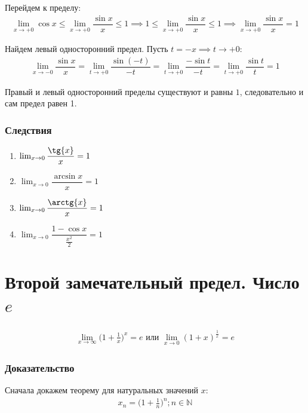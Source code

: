 \documentclass[a4paper,12pt]{extbook}
\theoremstyle{named}
\theoremstyle{named}
\begin{document}
Перейдем к пределу:
\begin{gather*}
    \lim_{x \to +0}{\cos{x}} \leq \lim_{x \to +0}{\dfrac{\sin{x}}{x}} \leq 1 \implies 1 \leq \lim_{x \to +0}{\dfrac{\sin{x}}{x}} \leq 1 \implies \lim_{x \to +0}{\dfrac{\sin{x}}{x}} = 1
\end{gather*}

Найдем левый односторонний предел. Пусть \(t = -x \implies t \to +0\):
\begin{gather*}
    \lim_{x \to -0}{\dfrac{\sin{x}}{x}} = \lim_{t \to +0}{\dfrac{\sin{(-t)}}{-t}} = \lim_{t \to +0}{\dfrac{-\sin{t}}{-t}} = \lim_{t \to +0}{\dfrac{\sin{t}}{t}} = 1
\end{gather*}

Правый и левый односторонний пределы существуют и равны \(1\), следовательно и сам предел равен 1.

\subsubsection*{Следствия}
\begin{enumerate}
    \item {\(\lim_{x \to 0}{\dfrac{\tg{x}}{x}} = 1\)}
    \item {\(\lim_{x \to 0}{\dfrac{\arcsin{x}}{x}} = 1\)}
    \item {\(\lim_{x \to 0}{\dfrac{\arctg{x}}{x}} = 1\)}
    \item {\(\lim_{x \to 0}{\dfrac{1 - \cos{x}}{\frac{x^2}{2}}} = 1\)}
\end{enumerate}



\section{Второй замечательный предел. Число \(e\)}\label{sec:limit_2}
\begin{gather*}
    \lim_{x \to \infty}{\Big(1 + \frac{1}{x}\Big)^x} = e \text{ или } \lim_{x \to 0}{(1 + x)^\frac{1}{x}} = e
\end{gather*}

\subsubsection*{Доказательство}
Сначала докажем теорему для натуральных значений \(x\):
\begin{gather*}
    x_n = \Big(1 + \frac{1}{n}\Big)^n; n \in \mathbb{N}
\end{gather*}
\end{document}
